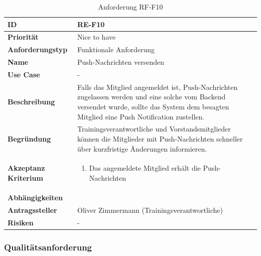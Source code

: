 \begin{table}[ht]
\centering
  \begin{tabular}{ l | p{8cm} }
	\hline
	\rowcolor{gray}
	\textbf{ID} 			&	\textbf{RE-F10}\\ \hline
	\textbf{Priorität} 		&	Nice to have\\ \hline
	\textbf{Anforderungstyp}	&	Funktionale Anforderung\\ \hline
	\textbf{Name} 			&	Push-Nachrichten versenden\\ \hline
	\textbf{Use Case} 		&	-\\ \hline
	\textbf{Beschreibung} 	&	Falls das Mitglied angemeldet ist, Push-Nachrichten zugelassen werden und eine solche vom Backend versendet wurde, sollte das System dem besagten Mitglied eine Push Notification zustellen.\\ \hline
	\textbf{Begründung} 		&	Trainingsverantwortliche und Vorstandsmitglieder können die Mitglieder mit Push-Nachrichten schneller über kurzfristige Änderungen informieren.\\ \hline
	\textbf{Akzeptanz Kriterium}	&	\begin{enumerate}
					\item Das angemeldete Mitglied erhält die Push-Nachrichten
					\end{enumerate}
					\\ \hline
	\textbf{Abhängigkeiten} 	&	\nameref{table:req_1}\\ \hline
	\textbf{Antragssteller} 	&	Oliver Zimmermann (Trainingsverantwortliche)\\ \hline
	\textbf{Risiken}	 	&	-
  \end{tabular}
   \caption{Anforderung RF-F10}\label{table:req_10}
\end{table}

\newpage
\FloatBarrier
\subsubsection{Qualitätsanforderung}\label{non_func_anforderungen}


